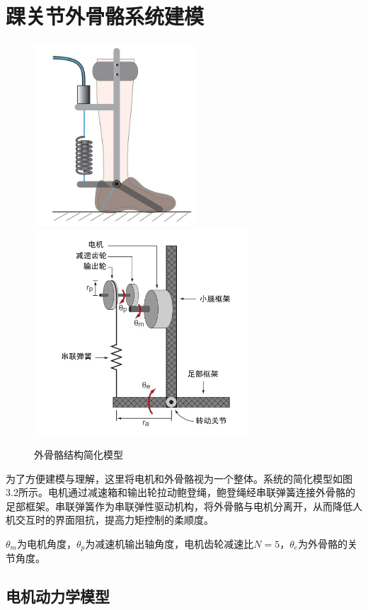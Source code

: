 \section{踝关节外骨骼系统建模}

\begin{figure}[!htb]
    \label{fig:sub1}{\includegraphics[width=6cm]{fig/f50.jpg}}
    \label{fig:sub2}{\includegraphics[width=8cm]{fig/f49.png}}
    \caption{外骨骼结构简化模型}
    \label{fig:subfigss}
\end{figure}

为了方便建模与理解，这里将电机和外骨骼视为一个整体。系统的简化模型如图3.2所示。电机通过减速箱和输出轮拉动鲍登绳，鲍登绳经串联弹簧连接外骨骼的足部框架。串联弹簧作为串联弹性驱动机构，将外骨骼与电机分离开，从而降低人机交互时的界面阻抗，提高力矩控制的柔顺度。

$\theta_m$为电机角度，$\theta_p$为减速机输出轴角度，电机齿轮减速比$N=5$，$\theta_e$为外骨骼的关节角度。

\subsection{电机动力学模型}

